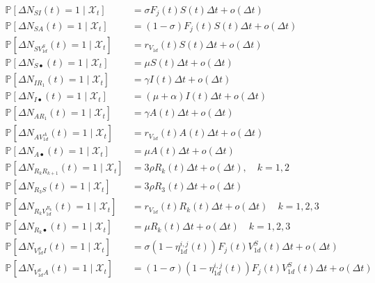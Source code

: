 \begin{fullwidth}
\begingroup
\allowdisplaybreaks
\label{eq:stochsys}
\begin{align}
    \mathbb{P}\left[ \Delta N_{SI}(t) = 1 \mid\mathcal{X}_t\right] &= \sigma F_j(t) S(t) \Delta t + o(\Delta t)\\
    \mathbb{P}\left[ \Delta N_{SA}(t) = 1 \mid\mathcal{X}_t\right] &= (1-\sigma) F_j(t) S(t) \Delta t + o(\Delta t)\\
    \mathbb{P}\left[ \Delta N_{SV_{1d}^S}(t) = 1 \mid\mathcal{X}_t\right] &= r_{V_{1d}}(t) S(t) \Delta t + o(\Delta t)\\
    \mathbb{P}\left[ \Delta N_{S\bullet}(t) = 1 \mid\mathcal{X}_t\right] &= \mu  S(t) \Delta t + o(\Delta t)\\
    \mathbb{P}\left[ \Delta N_{IR_1}(t) = 1 \mid\mathcal{X}_t\right] &= \gamma I(t) \Delta t + o(\Delta t)\\
    \mathbb{P}\left[ \Delta N_{I\bullet}(t) = 1 \mid\mathcal{X}_t\right] &= (\mu+\alpha)I(t) \Delta t + o(\Delta t)\\
    \mathbb{P}\left[ \Delta N_{AR_1}(t) = 1 \mid\mathcal{X}_t\right] &= \gamma A(t) \Delta t + o(\Delta t)\\
      \mathbb{P}\left[ \Delta N_{AV_{1d}^A}(t) = 1 \mid\mathcal{X}_t\right] &= r_{V_{1d}}(t) A(t) \Delta t + o(\Delta t)\\
      \mathbb{P}\left[ \Delta N_{A\bullet}(t) = 1 \mid\mathcal{X}_t\right] &= \mu  A(t) \Delta t + o(\Delta t)\\
    \mathbb{P}\left[ \Delta N_{R_kR_{k+1}}(t) = 1 \mid\mathcal{X}_t\right] &= 3\rho R_k(t) \Delta t + o(\Delta t),\quad k=1,2\\
    \mathbb{P}\left[ \Delta N_{R_3S}(t) = 1 \mid\mathcal{X}_t\right] &= 3\rho R_3(t) \Delta t + o(\Delta t)\\
    \mathbb{P}\left[ \Delta N_{R_kV_{1d}^{R_k}}(t) = 1 \mid\mathcal{X}_t\right] &= r_{V_{1d}}(t) R_k(t) \Delta t + o(\Delta t)\quad k=1,2,3\\
    \mathbb{P}\left[ \Delta N_{R_k\bullet}(t) = 1 \mid\mathcal{X}_t\right] &= \mu  R_k(t) \Delta t + o(\Delta t)\quad k=1,2,3\\
    \mathbb{P}\left[ \Delta N_{V_{1d}^SI}(t) = 1 \mid\mathcal{X}_t\right] &=  \sigma (1-\eta_{1d}^{i,j}(t)) F_j(t) V_{1d}^S(t) \Delta t + o(\Delta t)\\
    \mathbb{P}\left[ \Delta N_{V_{1d}^SA}(t) = 1 \mid\mathcal{X}_t\right] &=  (1-\sigma) (1-\eta_{1d}^{i,j}(t)) F_j(t) V_{1d}^S(t) \Delta t + o(\Delta t)\\

\end{align}
\end{fullwidth}
